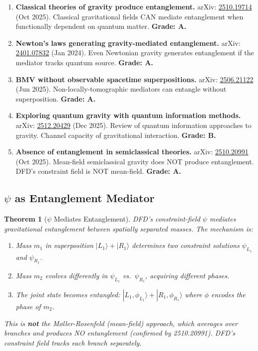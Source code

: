 \documentclass[11pt,a4paper]{article}
\newtheorem{theorem}{Theorem}
\begin{document}
\begin{enumerate}
\item \textbf{Classical theories of gravity produce entanglement.} arXiv: \href{https://arxiv.org/abs/2510.19714}{2510.19714} (Oct 2025). Classical gravitational fields CAN mediate entanglement when functionally dependent on quantum matter. \textbf{Grade: A.}

\item \textbf{Newton's laws generating gravity-mediated entanglement.} arXiv: \href{https://arxiv.org/abs/2401.07832}{2401.07832} (Jan 2024). Even Newtonian gravity generates entanglement if the mediator tracks quantum source. \textbf{Grade: A.}

\item \textbf{BMV without observable spacetime superpositions.} arXiv: \href{https://arxiv.org/abs/2506.21122}{2506.21122} (Jun 2025). Non-locally-tomographic mediators can entangle without superposition. \textbf{Grade: A.}

\item \textbf{Exploring quantum gravity with quantum information methods.} arXiv: \href{https://arxiv.org/abs/2512.20429}{2512.20429} (Dec 2025). Review of quantum information approaches to gravity. Channel capacity of gravitational interaction. \textbf{Grade: B.}

\item \textbf{Absence of entanglement in semiclassical theories.} arXiv: \href{https://arxiv.org/abs/2510.20991}{2510.20991} (Oct 2025). Mean-field semiclassical gravity does NOT produce entanglement. DFD's constraint field is NOT mean-field. \textbf{Grade: A.}
\end{enumerate}

\subsection{$\psi$ as Entanglement Mediator}
\label{sec:entanglement-mediator}

\begin{theorem}[$\psi$ Mediates Entanglement]
\label{thm:psi-entanglement}
DFD's constraint-field $\psi$ mediates gravitational entanglement between spatially separated masses. The mechanism is:
\begin{enumerate}
\item Mass $m_1$ in superposition $|L_1\rangle + |R_1\rangle$ determines two constraint solutions $\psi_{L_1}$ and $\psi_{R_1}$.
\item Mass $m_2$ evolves differently in $\psi_{L_1}$ vs.\ $\psi_{R_1}$, acquiring different phases.
\item The joint state becomes entangled: $|L_1, \phi_{L_1}\rangle + |R_1, \phi_{R_1}\rangle$ where $\phi$ encodes the phase of $m_2$.
\end{enumerate}

This is \textbf{not} the M\o ller-Rosenfeld (mean-field) approach, which averages over branches and produces NO entanglement (confirmed by 2510.20991). DFD's constraint field tracks each branch separately.
\end{theorem}
\end{document}
